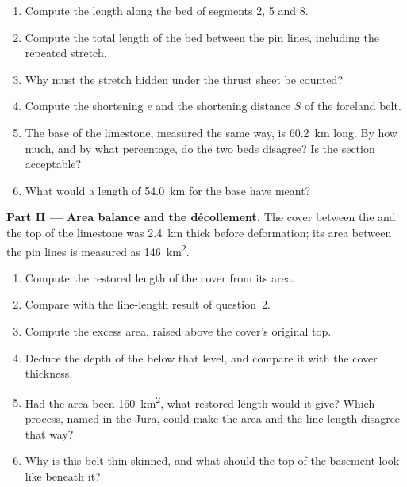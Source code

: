 \begin{problem}
\begin{enumerate}
\item Compute the length along the bed of segments 2, 5 and 8.
\item Compute the total length of the bed between the pin lines, including the repeated
stretch.
\item Why must the stretch hidden under the thrust sheet be counted?
\item Compute the shortening $e$ and the shortening distance $S$ of the foreland belt.
\item The base of the limestone, measured the same way, is \qty{60.2}{km} long. By how much,
and by what percentage, do the two beds disagree? Is the section acceptable?
\item What would a length of \qty{54.0}{km} for the base have meant?
\end{enumerate}

\noindent\textbf{Part II --- Area balance and the décollement.} The cover between the
 and the top of the limestone was \qty{2.4}{km} thick before deformation; its
area between the pin lines is measured as \qty{146}{km^2}.
\begin{enumerate}[resume]
\item Compute the restored length of the cover from its area.
\item Compare with the line-length result of question~2.
\item Compute the excess area, raised above the cover's original top.
\item Deduce the depth of the  below that level, and compare it with the cover
thickness.
\item Had the area been \qty{160}{km^2}, what restored length would it give? Which process,
named in the Jura, could make the area and the line length disagree that way?
\item Why is this belt thin-skinned, and what should the top of the basement look like
beneath it?
\end{enumerate}


\end{problem}
